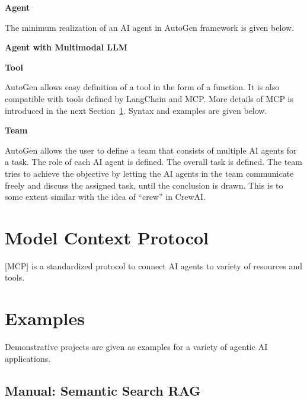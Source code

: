 \vspace{0.1in}
\noindent \textbf{Agent}
\vspace{0.1in}

The minimum realization of an AI agent in AutoGen framework is given below.


\vspace{0.1in}
\noindent \textbf{Agent with Multimodal LLM}
\vspace{0.1in}




\vspace{0.1in}
\noindent \textbf{Tool}
\vspace{0.1in}

AutoGen allows easy definition of a tool in the form of a function. It is also compatible with tools defined by LangChain and MCP. More details of MCP is introduced in the next Section~\ref{sec:mcp}. Syntax and examples are given below.

\vspace{0.1in}
\noindent \textbf{Team}
\vspace{0.1in}

AutoGen allows the user to define a team that consists of multiple AI agents for a task. The role of each AI agent is defined. The overall task is defined. The team tries to achieve the objective by letting the AI agents in the team communicate freely and discuss the assigned task, until the conclusion is drawn. This is to some extent similar with the idea of ``crew'' in CrewAI. 




\section{Model Context Protocol} \label{sec:mcp}

[MCP] is a standardized protocol to connect AI agents to variety of resources and tools.











\section{Examples}

Demonstrative projects are given as examples for a variety of agentic AI applications. 

\subsection{Manual: Semantic Search RAG}

